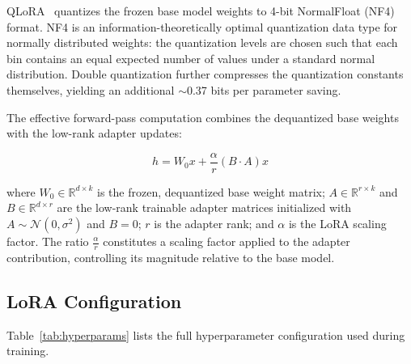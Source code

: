 \documentclass[conference]{IEEEtran}
\begin{document}
QLoRA~\cite{dettmers2023qlora} quantizes the frozen base model weights to 4-bit NormalFloat (NF4) format. NF4 is an information-theoretically optimal quantization data type for normally distributed weights: the quantization levels are chosen such that each bin contains an equal expected number of values under a standard normal distribution. Double quantization further compresses the quantization constants themselves, yielding an additional $\sim$0.37 bits per parameter saving.

The effective forward-pass computation combines the dequantized base weights with the low-rank adapter updates:

\begin{equation}
h = W_{0} x + \frac{\alpha}{r} \left(B \cdot A\right) x
\label{eq:lora}
\end{equation}

where $W_{0} \in \mathbb{R}^{d \times k}$ is the frozen, dequantized base weight matrix; $A \in \mathbb{R}^{r \times k}$ and $B \in \mathbb{R}^{d \times r}$ are the low-rank trainable adapter matrices initialized with $A \sim \mathcal{N}(0, \sigma^2)$ and $B = 0$; $r$ is the adapter rank; and $\alpha$ is the LoRA scaling factor. The ratio $\frac{\alpha}{r}$ constitutes a scaling factor applied to the adapter contribution, controlling its magnitude relative to the base model.

\subsection{LoRA Configuration}

Table~\ref{tab:hyperparams} lists the full hyperparameter configuration used during training.
\end{document}
